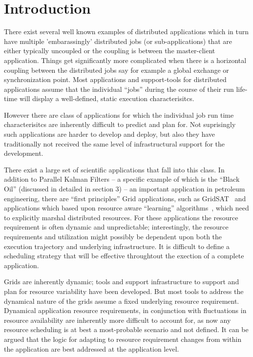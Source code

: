 \documentclass[conference,final]{IEEEtran}
\newcommand{\C}{\comment}
\begin{document}
\section{Introduction}\C{Jha}

There exist several well known examples of distributed applications
which in turn have multiple 'embarassingly' distributed jobs (or
sub-applications) that are either typically uncoupled or the coupling
is between the master-client application.  Things get significantly
more complicated when there is a horizontal coupling between the
distributed jobs say for example a global exchange or synchronization
point.  Most applications and support-tools for distributed
applications assume that the individual ``jobs'' during the course of
their run life-time will display a well-defined, static execution
characterisitcs.

However there are class of applications for which the individual job
run time characterisitcs are inherently difficult to predict and plan
for. Not suprisingly such applications are harder to develop and
deploy, but also they have traditionally not received the same level
of infrastructural support for the development.  

There exist a large set of scientific applications that fall into this
class. In addition to Parallel Kalman Filters -- a specific example of
which is the ``Black Oil'' (discussed in detailed in section 3) -- an
important application in petroleum engineering, there are ``first
principles'' Grid applications, such as GridSAT~\cite{gridsat03} and
applications which based upon resource aware ``learning''
algorithms~\cite{ majority_voting}, which need to explicitly marshal
distributed resources. For these applications the resource requirement
is often dynamic and unpredictable; interestingly, the resource
requirements and utilization might possibly be dependent upon both the
execution trajectory and underlying infrastructure. It is difficult to
define a scheduling strategy that will be effective throughtout the
exection of a complete application.

Grids are inherently dynamic; tools and support infrastructure to
support and plan for resource variability have been developed.  But
most tools to address the dynamical nature of the grids assume a fixed
underlying resource requirement.  Dynamical application resource
requirements, in conjunction with fluctuations in resource
availability are inherently more difficult to account for, as now any
resource scheduling is at best a most-probable scenario and not
defined. It can be argued that the logic for adapting to resource
requirement changes from within the application are best addressed at
the application level.
\end{document}
